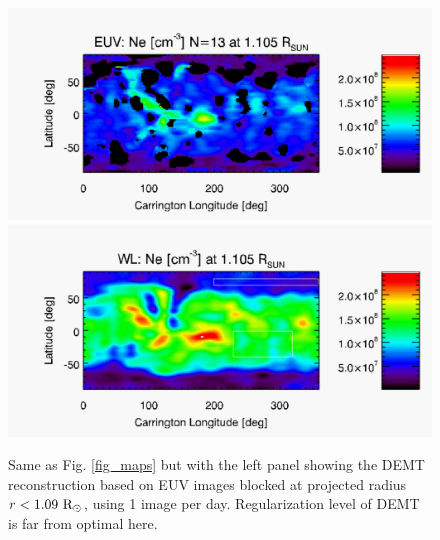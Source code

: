\documentclass[baaa]{baaa}
\begin{document}
\clearpage


\begin{figure}[]
  \centering
  \includegraphics[width=\columnwidth]{map_ne_aia_bloqueo109_n13.pdf}
  \includegraphics[width=\columnwidth]{map_ne_kcor.pdf}
  \caption{Same as Fig. \ref{fig_maps} but with the left panel showing the DEMT reconstruction based on EUV images blocked at projected radius $r<1.09~\rm{R}_\odot$, using 1 image per day. Regularization level of DEMT is far from optimal here.}
  \label{fig_maps4}
\end{figure}
\end{document}
